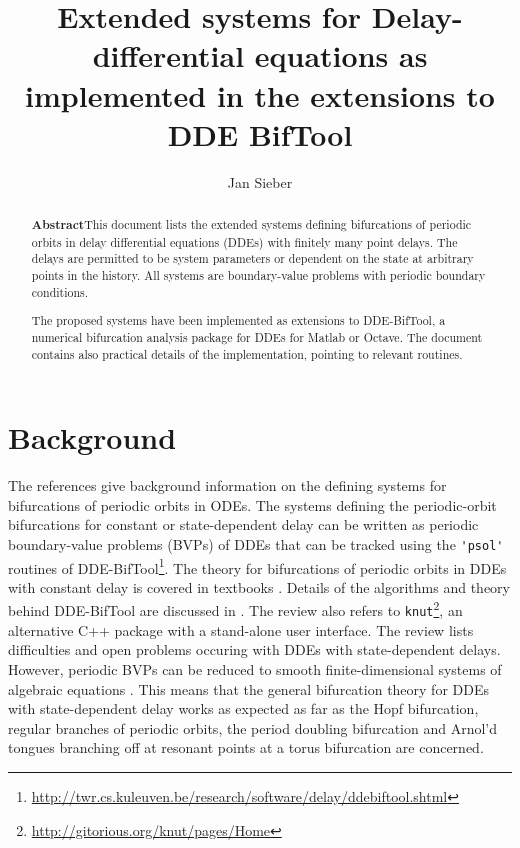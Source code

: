 \documentclass[11pt]{scrartcl}
\title{Extended systems for 
  Delay-differential equations as 
  implemented in the extensions to  DDE BifTool}
\author{Jan Sieber}\date{}
\newcommand{\blist}[1]{\mbox{\lstinline!#1!}}
\begin{document}
\maketitle
\tableofcontents
\begin{abstract}
  \noindent
  \textbf{\textsf{Abstract}}\quad This document lists the extended
  systems defining bifurcations of periodic orbits in delay
  differential equations (DDEs) with finitely many point delays. The
  delays are permitted to be system parameters or dependent on the
  state at arbitrary points in the history. All systems are
  boundary-value problems with periodic boundary conditions.

  The proposed systems have been implemented as extensions to
  DDE-BifTool, a numerical bifurcation analysis package for DDEs for
  Matlab or Octave. The document contains also practical details of
  the implementation, pointing to relevant routines.
\end{abstract}


\section{Background}
\label{sec:background}
The references \cite{MDO09,G00,D07,DCFKSW98} give background
information on the defining systems for bifurcations of periodic
orbits in ODEs.  The systems defining the periodic-orbit bifurcations
for constant or state-dependent delay can be written as periodic
boundary-value problems (BVPs) of DDEs that can be tracked using the
\blist{'psol'} routines of
DDE-BifTool\footnote{\url{http://twr.cs.kuleuven.be/research/software/delay/ddebiftool.shtml}}. The
theory for bifurcations of periodic orbits in DDEs with constant delay
is covered in textbooks \cite{S89,HL93,DGLW95}. Details of the
algorithms and theory behind DDE-BifTool are discussed in
\cite{ELS01,ELR02,SER02,RS07,VLR08}. The review \cite{RS07} also
refers to
\texttt{knut}\footnote{\url{http://gitorious.org/knut/pages/Home}}, an
alternative C++ package with a stand-alone user interface. The review
\cite{HKWW06} lists difficulties and open problems occuring with DDEs
with state-dependent delays. However, periodic BVPs can be reduced to
smooth finite-dimensional systems of algebraic equations
\cite{S12}. This means that the general bifurcation theory for DDEs
with state-dependent delay works as expected as far as the Hopf
bifurcation, regular branches of periodic orbits, the period doubling
bifurcation and Arnol'd tongues branching off at resonant points at a
torus bifurcation are concerned.
\end{document}
